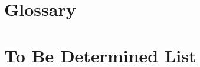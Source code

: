 \newpage
\appendix

\begin{appendices}
    \chapter{Glossary}\label{apn:glossary}
        \printglossaries 
    \chapter{To Be Determined List}\label{apn:tbdl}
        
\end{appendices}

